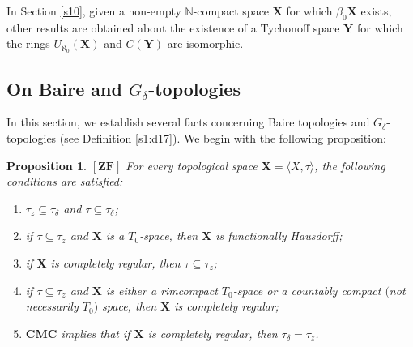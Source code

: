 \documentclass[12pt,twoside,leqno]{article}
\theoremstyle{plain}
\newtheorem{proposition}[theorem]{Proposition}
\theoremstyle{definition}
\theoremstyle{remark}
\begin{document}
In Section \ref{s10}, given a non-empty $\mathbb{N}$-compact space $\mathbf{X}$ for which $\beta_0\mathbf{X}$ exists, other results are obtained about the existence of a Tychonoff space $\mathbf{Y}$ for which the rings $U_{\aleph_0}(\mathbf{X})$ and $C(\mathbf{Y})$ are isomorphic.







\subsection{On Baire and $G_{\delta}$-topologies}
\label{s3}

In this section, we establish several facts concerning Baire topologies and $G_{\delta}$-topologies (see Definition \ref{s1:d17}). We begin with the following proposition:

\begin{proposition}
	\label{s3:p1} 
	$[\mathbf{ZF}]$ For every topological space $\mathbf{X}=\langle X, \tau\rangle$, the following conditions are satisfied:
	\begin{enumerate}
		\item[(i)] $\tau_z\subseteq\tau_{\delta}$ and $\tau\subseteq\tau_{\delta}$;
		\item[(ii)] if $\tau\subseteq\tau_z$ and $\mathbf{X}$ is a $T_0$-space, then $\mathbf{X}$ is functionally Hausdorff;
		\item[(iii)] if $\mathbf{X}$ is completely regular, then $\tau\subseteq\tau_{z}$;
		\item[(iv)] if $\tau\subseteq\tau_z$ and $\mathbf{X}$ is either a rimcompact $T_0$-space or a countably compact $($not necessarily $T_0$$)$ space, then $\mathbf{X}$ is completely regular;
		\item[(v)] $\mathbf{CMC}$ implies that if $\mathbf{X}$ is completely regular, then $\tau_{\delta}=\tau_z$. 
	\end{enumerate}
\end{proposition}
\end{document}
